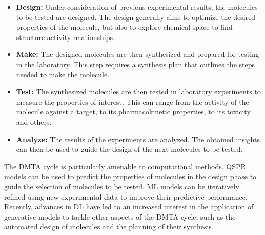 \begin{itemize}
    \item \textbf{Design:} Under consideration of previous experimental results, the molecules to
          be tested are designed. The design generally aims to optimize the desired properties of
          the molecule, but also to explore chemical space to find structure-activity relationships.
    \item \textbf{Make:} The designed molecules are then synthesized and prepared for testing in
          the laboratory. This step requires a synthesis plan that outlines the steps needed to
          make the molecule.
    \item \textbf{Test:} The synthesized molecules are then tested in laboratory experiments to
          measure the properties of interest. This can range from the activity of the molecule
          against a target, to its pharmacokinetic properties, to its toxicity and others.
    \item \textbf{Analyze:} The results of the experiments are analyzed. The obtained insights
          can then be used to guide the design of the next molecules to be tested.
\end{itemize}

The \ac{DMTA} cycle is particularly amenable to computational methods. \Ac{QSPR} models can be used
to predict the properties of molecules in the design phase to guide the selection of molecules
to be tested. \ac{ML} models can be iteratively refined using new experimental data to
improve their predictive performance. Recently, advances in \ac{DL} have led to an increased
interest in the application of generative models to tackle other aspects of the \ac{DMTA} cycle,
such as the automated design of molecules and the planning of their synthesis.

